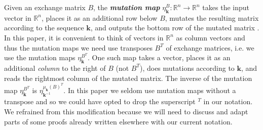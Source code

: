 \documentclass{amsart}
\theoremstyle{definition}
\theoremstyle{remark}
\numberwithin{equation}{section}
\newcommand{\newword}[1]{\textbf{\emph{#1}}}
\newcommand{\reals}{\mathbb R}
\newcommand{\0}{{\mathbf{0}}}
\newcommand{\kk}{{\boldsymbol{k}}}
\begin{document}
Given an exchange matrix $B$, the \newword{mutation map} $\eta^B_\kk:\reals^n\to\reals^n$ takes the input vector in $\reals^n$, places it as an additional row below $B$, mutates the resulting matrix according to the sequence $\kk$, and outputs the bottom row of the mutated matrix \cite[Definition~4.1]{universal}.
In this paper, it is convenient to think of vectors in $\reals^n$ as column vectors and thus the mutation maps we need use transposes $B^T$ of exchange matrices, i.e. we use the mutation maps $\eta_\kk^{B^T}$.
One such map takes a vector, places it as an additional \emph{column} to the right of $B$ (not $B^T$), does mutations according to $\kk$, and reads the rightmost column of the mutated matrix.
The inverse of the mutation map $\eta^{B^T}_\kk$ is $\eta_{\kk^{-1}}^{\mu_\kk(B)^T}$.
In this paper we seldom use mutation maps without a transpose and so we could have opted to drop the superscript $^T$ in our notation.
We refrained from this modification because we will need to discuss and adapt parts of some proofs already written elsewhere with our current notation.
\end{document}
